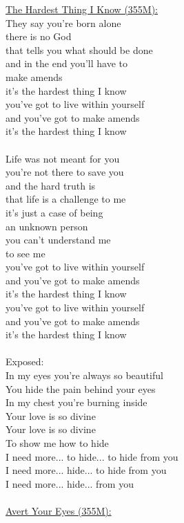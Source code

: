 \documentclass[11pt]{article}
\begin{document}
\underline{The Hardest Thing I Know (355M):}\\
They say you're born alone\\
there is no God\\
that tells you what should be done\\
and in the end you'll have to\\
make amends\\
it's the hardest thing I know\\
you've got to live within yourself\\
and you've got to make amends\\
it's the hardest thing I know\\
\\
Life was not meant for you\\
you're not there to save you\\
and the hard truth is\\
that life is a challenge to me\\
it's just a case of being\\
an unknown person\\
you can't understand me\\
to see me\\
you've got to live within yourself\\
and you've got to make amends\\
it's the hardest thing I know\\
you've got to live within yourself\\
and you've got to make amends\\
it's the hardest thing I know\\
\\
Exposed:\\
In my eyes you're always so beautiful\\
You hide the pain behind your eyes\\
In my chest you're burning inside\\
Your love is so divine\\
Your love is so divine\\
To show me how to hide\\
I need more... to hide... to hide from you\\
I need more... hide... to hide from you\\
I need more... hide... from you\\
\\
\underline{Avert Your Eyes (355M):}\\
\end{document}
